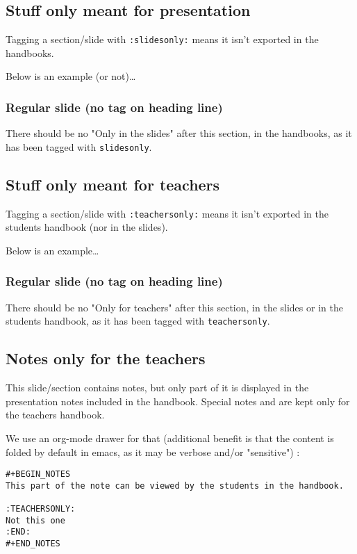 \documentclass[a4paper]{article}
\begin{document}
\subsection{Stuff only meant for presentation}
\label{sec:orgfc755f3}

Tagging a section/slide with \texttt{:slidesonly:} means it isn't exported in the handbooks.

Below is an example (or not)\ldots{}

\subsubsection{Regular slide (no tag on heading line)}
\label{sec:org8329b6d}

There should be no "Only in the slides" after this section, in the
handbooks, as it has been tagged with \texttt{slidesonly}.

\subsection{Stuff only meant for teachers}
\label{sec:org626e06e}

Tagging a section/slide with \texttt{:teachersonly:} means it isn't exported in the students handbook (nor in the slides).

Below is an example\ldots{}

\subsubsection{Regular slide (no tag on heading line)}
\label{sec:orgdcd152e}

There should be no "Only for teachers" after this section, in the slides or in the
students handbook, as it has been tagged with \texttt{teachersonly}.

\subsection{Notes only for the teachers}
\label{sec:orgd69264a}

This slide/section contains notes, but only part of it is displayed in
the presentation notes included in the handbook. Special notes and are
kept only for the teachers handbook.

We use an org-mode drawer for that (additional benefit is that the content is folded by default in emacs, as it may be verbose and/or "sensitive") :
\begin{verbatim}
#+BEGIN_NOTES
This part of the note can be viewed by the students in the handbook.

:TEACHERSONLY:
Not this one
:END:
#+END_NOTES
\end{verbatim}
\end{document}
